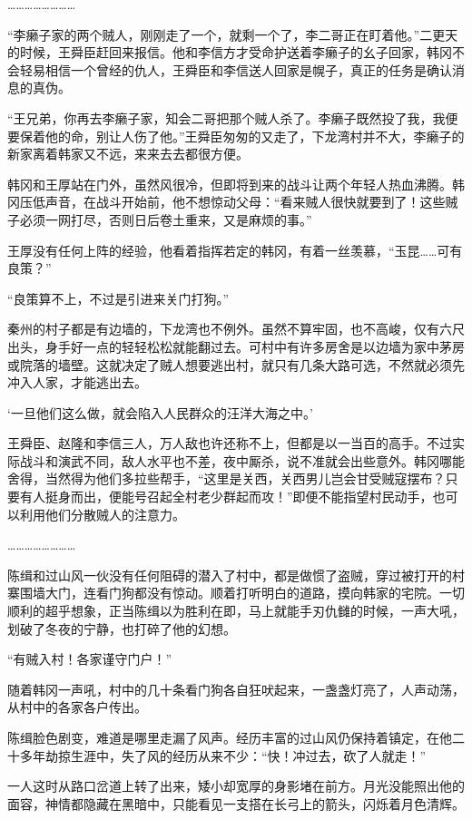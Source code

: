 ……………………

“李癞子家的两个贼人，刚刚走了一个，就剩一个了，李二哥正在盯着他。”二更天的时候，王舜臣赶回来报信。他和李信方才受命护送着李癞子的幺子回家，韩冈不会轻易相信一个曾经的仇人，王舜臣和李信送人回家是幌子，真正的任务是确认消息的真伪。

“王兄弟，你再去李癞子家，知会二哥把那个贼人杀了。李癞子既然投了我，我便要保着他的命，别让人伤了他。”王舜臣匆匆的又走了，下龙湾村并不大，李癞子的新家离着韩家又不远，来来去去都很方便。

韩冈和王厚站在门外，虽然风很冷，但即将到来的战斗让两个年轻人热血沸腾。韩冈压低声音，在战斗开始前，他不想惊动父母：“看来贼人很快就要到了！这些贼子必须一网打尽，否则日后卷土重来，又是麻烦的事。”

王厚没有任何上阵的经验，他看着指挥若定的韩冈，有着一丝羡慕，“玉昆……可有良策？”

“良策算不上，不过是引进来关门打狗。”

秦州的村子都是有边墙的，下龙湾也不例外。虽然不算牢固，也不高峻，仅有六尺出头，身手好一点的轻轻松松就能翻过去。可村中有许多房舍是以边墙为家中茅房或院落的墙壁。这就决定了贼人想要逃出村，就只有几条大路可选，不然就必须先冲入人家，才能逃出去。

‘一旦他们这么做，就会陷入人民群众的汪洋大海之中。’

王舜臣、赵隆和李信三人，万人敌也许还称不上，但都是以一当百的高手。不过实际战斗和演武不同，敌人水平也不差，夜中厮杀，说不准就会出些意外。韩冈哪能舍得，当然得为他们多拉些帮手，“这里是关西，关西男儿岂会甘受贼寇摆布？只要有人挺身而出，便能号召起全村老少群起而攻！”即便不能指望村民动手，也可以利用他们分散贼人的注意力。

……………………

陈缉和过山风一伙没有任何阻碍的潜入了村中，都是做惯了盗贼，穿过被打开的村寨围墙大门，连看门狗都没有惊动。顺着打听明白的道路，摸向韩家的宅院。一切顺利的超乎想象，正当陈缉以为胜利在即，马上就能手刃仇雠的时候，一声大吼，划破了冬夜的宁静，也打碎了他的幻想。

“有贼入村！各家谨守门户！”

随着韩冈一声吼，村中的几十条看门狗各自狂吠起来，一盏盏灯亮了，人声动荡，从村中的各家各户传出。

陈缉脸色剧变，难道是哪里走漏了风声。经历丰富的过山风仍保持着镇定，在他二十多年劫掠生涯中，失了风的经历从来不少：“快！冲过去，砍了人就走！”

一人这时从路口岔道上转了出来，矮小却宽厚的身影堵在前方。月光没能照出他的面容，神情都隐藏在黑暗中，只能看见一支搭在长弓上的箭头，闪烁着月色清辉。

